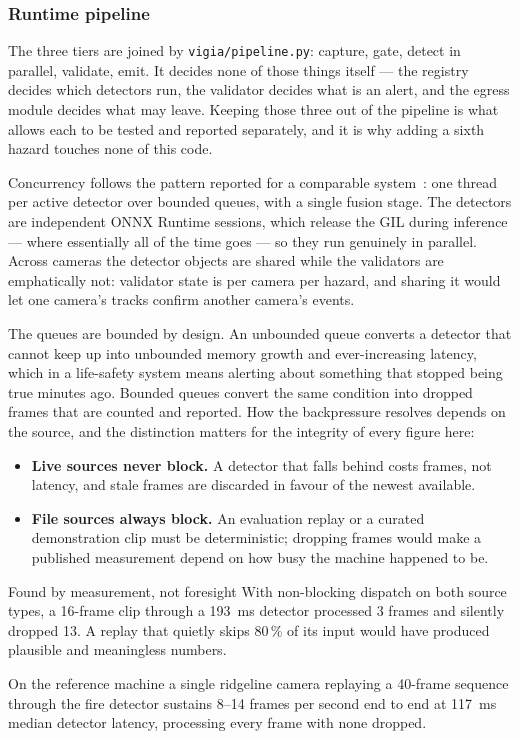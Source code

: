 \subsubsection{Runtime pipeline}
\label{sec:pipeline}

The three tiers are joined by \texttt{vigia/pipeline.py}: capture, gate,
detect in parallel, validate, emit. It decides none of those things itself —
the registry decides which detectors run, the validator decides what is an
alert, and the egress module decides what may leave. Keeping those three out
of the pipeline is what allows each to be tested and reported separately, and
it is why adding a sixth hazard touches none of this code.

Concurrency follows the pattern reported for a comparable
system~\citep{multitasksystem}: one
thread per active detector over bounded queues, with a single fusion stage.
The detectors are independent ONNX Runtime sessions, which release the GIL
during inference — where essentially all of the time goes — so they run
genuinely in parallel. Across cameras the detector objects are shared while
the validators are emphatically not: validator state is per camera per hazard,
and sharing it would let one camera's tracks confirm another camera's events.

The queues are bounded by design. An unbounded queue converts a detector that
cannot keep up into unbounded memory growth and ever-increasing latency, which
in a life-safety system means alerting about something that stopped being true
minutes ago. Bounded queues convert the same condition into dropped frames
that are counted and reported. How the backpressure resolves depends on the
source, and the distinction matters for the integrity of every figure here:

\begin{itemize}
  \item \textbf{Live sources never block.} A detector that falls behind costs
        frames, not latency, and stale frames are discarded in favour of the
        newest available.
  \item \textbf{File sources always block.} An evaluation replay or a curated
        demonstration clip must be deterministic; dropping frames would make a
        published measurement depend on how busy the machine happened to be.
\end{itemize}

\begin{recorded}{Found by measurement, not foresight}
With non-blocking dispatch on both source types, a 16-frame clip through a
\SI{193}{\milli\second} detector processed 3 frames and silently dropped 13. A
replay that quietly skips 80\,\% of its input would have produced plausible
and meaningless numbers.
\end{recorded}

On the reference machine a single ridgeline camera replaying a 40-frame
sequence through the fire detector sustains 8--14 frames per second end to end
at \SI{117}{\milli\second} median detector latency, processing every frame
with none dropped.
